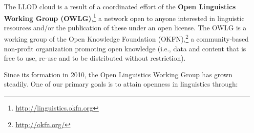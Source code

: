 The LLOD cloud is a result of a coordinated effort of the {\bf Open Linguistics Working Group (OWLG)},\footnote{\url{http://linguistics.okfn.org}} a network open to anyone interested in linguistic resources and/or the publication of these under an open license. The OWLG is a working group of the Open Knowledge Foundation (OKFN),\footnote{\url{http://okfn.org/}} a community-based non-profit organization promoting open knowledge (i.e., data and content that is free to use, re-use and to be distributed without restriction).


Since its formation in 2010, the Open Linguistics Working Group has grown steadily. One of our primary goals is to attain openness in linguistics through:

